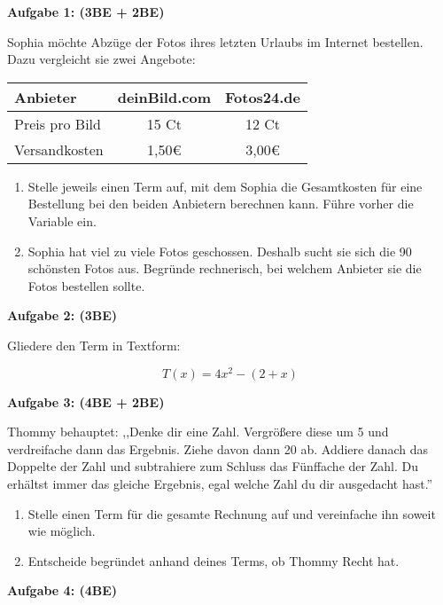 \documentclass[a4paper,12pt]{article}
\newcommand{\Aufgabe}[1]{
  {
  \vspace*{0.5cm}
  \textsf{\textbf{Aufgabe #1}}
  \vspace*{0.2cm}
  
  }
}
\begin{document}
\vspace{0.3cm}

\Aufgabe{1: (3BE + 2BE)}
Sophia möchte Abzüge der Fotos ihres letzten Urlaubs im Internet bestellen. Dazu vergleicht sie zwei Angebote:
\begin{center}
    \begin{tabular}{|l|c|c|}
        \hline
        Anbieter & deinBild.com & Fotos24.de \\
        \hline
        Preis pro Bild & 15 Ct & 12 Ct \\
        \hline
        Versandkosten & 1,50\euro & 3,00\euro \\
        \hline
    \end{tabular}
\end{center}

\begin{enumerate}[label={\alph*)}]
  \item Stelle jeweils einen Term auf, mit dem Sophia die Gesamtkosten für eine Bestellung bei den beiden Anbietern berechnen kann. Führe vorher die Variable ein.
  \item Sophia hat viel zu viele Fotos geschossen. Deshalb sucht sie sich die 90 schönsten Fotos aus. Begründe rechnerisch, bei welchem Anbieter sie die Fotos bestellen sollte.
\end{enumerate}

\Aufgabe{2: (3BE)}
Gliedere den Term in Textform:

\[ T(x) = 4x^2 - (2+x) \]

\Aufgabe{3: (4BE + 2BE)}
Thommy behauptet: ,,Denke dir eine Zahl. Vergrößere diese um 5 und verdreifache dann das Ergebnis. Ziehe davon dann 20 ab. Addiere danach das Doppelte der Zahl und subtrahiere zum Schluss das Fünffache der Zahl. Du erhältst immer das gleiche Ergebnis, egal welche Zahl du dir ausgedacht hast.''

\begin{enumerate}[label={\alph*)}]
  \item Stelle einen Term für die gesamte Rechnung auf und vereinfache ihn soweit wie möglich.
  \item Entscheide begründet anhand deines Terms, ob Thommy Recht hat.
\end{enumerate}


\Aufgabe{4: (4BE)}
\end{document}
